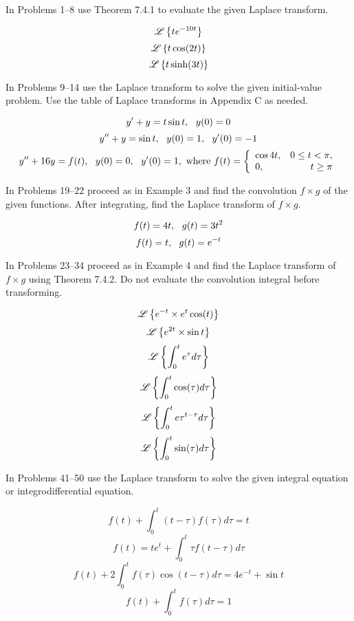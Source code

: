 \documentclass[chapter=7,section=4]{math252homework}
\begin{document}
In Problems 1--8 use Theorem 7.4.1 to evaluate the given Laplace transform.
\begin{problems}
	\problem \[ \laplace[te^{-10t}] \]
	\setcounter{problemsi}{2}
	\problem \[ \laplace[t\cos(2t)] \]
	\setcounter{problemsi}{5}
	\problem \[ \laplace[t\sinh(3t)] \]
\end{problems}

In Problems 9--14 use the Laplace transform to solve the given initial-value problem. Use the table of Laplace transforms in Appendix C as needed.
\begin{problems}[start=9]
	\problem \[ y' + y = t\sin t,\mbox{{ }{ }} y(0)=0 \]
	\setcounter{problemsi}{11}
	\problem \[ y'' + y = \sin t,\mbox{{ }{ }} y(0)=1,\mbox{{ }{ }} y'(0)=-1 \]
	\problem \[ y'' + 16y = f(t),\mbox{{ }{ }} y(0)=0,\mbox{{ }{ }} y'(0)=1, \mbox{ where }\\f(t) = \left\{ \begin{array}{lr}
		\cos 4t, & 0 \leq t < \pi,\\
		0, & t \geq \pi
	\end{array} \right. \]
\end{problems}

In Problems 19--22 proceed as in Example 3 and find the convolution $f\times g$ of the given functions. After integrating, find the Laplace transform of $f\times g$.
\begin{problems}[start=19]
	\problem \[ f(t) = 4t,\mbox{{ }{ }} g(t) = 3t^{2} \]
	\problem \[ f(t) = t,\mbox{{ }{ }} g(t)=e^{-t} \]
\end{problems}

In Problems 23--34 proceed as in Example 4 and find the Laplace transform of $f\times g$ using Theorem 7.4.2. Do not evaluate the convolution integral before transforming.
\begin{problems}[start=25]
	\problem \[ \laplace[e^{-t}\times e^{t}\cos(t)] \]
	\problem \[ \laplace[e^{2t}\times\sin t] \]
	\problem \[ \laplace[\int_{0}^{t} e^{\tau}d\tau] \]
	\problem \[ \laplace[\int_{0}^{t} \cos(\tau) d\tau] \]
	\setcounter{problemsi}{30}
	\problem \[ \laplace[\int_{0}^{t} e\tau^{t-\tau}d\tau] \]
	\setcounter{problemsi}{32}
	\problem \[ \laplace[\int_{0}^{t} \sin(\tau)d\tau] \]
\end{problems}

In Problems 41--50 use the Laplace transform to solve the given integral equation or integrodifferential equation.
\begin{problems}[start=41]
	\problem \[ f(t) + \int_{0}^{t} (t-\tau)f(\tau)d\tau = t \]
	\setcounter{problemsi}{42}
	\problem \[ f(t) = te^{t} + \int_{0}^{t} \tau f(t-\tau)d\tau \]
	\problem \[ f(t) + 2\int_{0}^{t}f(\tau)\cos(t-\tau)d\tau = 4e^{-t} + \sin t  \]
	\problem \[ f(t) + \int_{0}^{t} f(\tau)d\tau = 1 \]
\end{problems}
\end{document}
